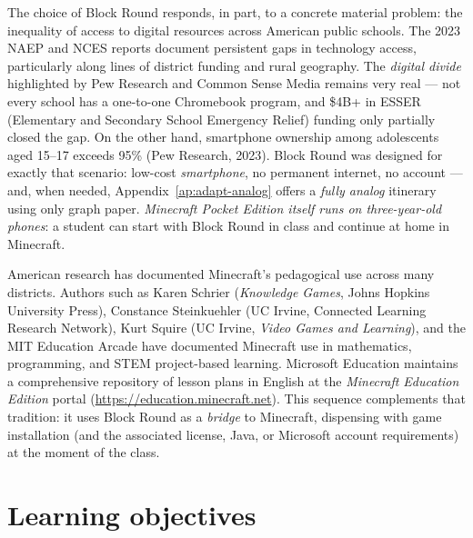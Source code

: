 \documentclass[12pt,a4paper]{scrartcl}
\begin{document}
\begin{note}
The choice of Block Round responds, in part, to a concrete material problem: the inequality of access to digital resources across American public schools. The 2023 NAEP and NCES reports document persistent gaps in technology access, particularly along lines of district funding and rural geography. The \emph{digital divide} highlighted by Pew Research and Common Sense Media remains very real --- not every school has a one-to-one Chromebook program, and \$4B+ in ESSER (Elementary and Secondary School Emergency Relief) funding only partially closed the gap. On the other hand, smartphone ownership among adolescents aged 15--17 exceeds 95\% (Pew Research, 2023). Block Round was designed for exactly that scenario: low-cost \emph{smartphone}, no permanent internet, no account --- and, when needed, Appendix~\ref{ap:adapt-analog} offers a \emph{fully analog} itinerary using only graph paper. \emph{Minecraft Pocket Edition itself runs on three-year-old phones}: a student can start with Block Round in class and continue at home in Minecraft.
\end{note}

\begin{minecraft}
American research has documented Minecraft's pedagogical use across many districts. Authors such as Karen Schrier (\emph{Knowledge Games}, Johns Hopkins University Press), Constance Steinkuehler (UC Irvine, Connected Learning Research Network), Kurt Squire (UC Irvine, \emph{Video Games and Learning}), and the MIT Education Arcade have documented Minecraft use in mathematics, programming, and STEM project-based learning. Microsoft Education maintains a comprehensive repository of lesson plans in English at the \emph{Minecraft Education Edition} portal (\url{https://education.minecraft.net}). This sequence complements that tradition: it uses Block Round as a \emph{bridge} to Minecraft, dispensing with game installation (and the associated license, Java, or Microsoft account requirements) at the moment of the class.
\end{minecraft}

\section{Learning objectives}\label{sec:objectives}
\end{document}
